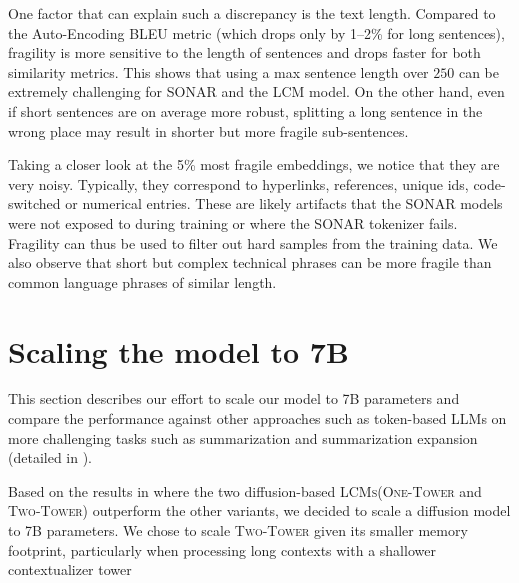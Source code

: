 \documentclass[twoside,11pt]{fairmeta}
\newcommand{\sonar}{\textsc{SONAR}\xspace}
\newcommand{\lcm}{\textsc{LCM}\xspace}
\newcommand{\lcms}{\textsc{LCMs}\xspace}
\newcommand{\twotower}{\textsc{Two-Tower}\xspace}
\newcommand{\interleaved}{\textsc{One-Tower}\xspace}
\newcommand{\ctxenc}{contextualizer\xspace}
\begin{document}
One factor that can explain such a discrepancy is the text length. Compared to the Auto-Encoding BLEU metric (which drops only by 1--2\% for long sentences),
fragility is more sensitive to the length of sentences and drops faster for both similarity metrics.
This shows that using a max sentence length over $250$ can be extremely challenging for \sonar and the \lcm model.
On the other hand, even if short sentences are on average more robust, 
splitting a long sentence in the wrong place may result in shorter but more fragile sub-sentences.

Taking a closer look at the 5\% most fragile embeddings, we notice that they are very noisy. 
Typically, they correspond to hyperlinks, references, unique ids, code-switched or numerical entries. These are likely artifacts that the \sonar models were not exposed to during training or where the \sonar tokenizer fails.
Fragility can thus be used to filter out hard samples from the training data.
We also observe that short but complex technical phrases can be more fragile than common language phrases of similar length.

\section{Scaling the model to 7B}
\label{sec:bigmodel}

This section describes our effort to scale our model to 7B parameters and compare the performance against other approaches such as token-based LLMs on more challenging tasks such as summarization and summarization expansion (detailed in ).

Based on the results in  where the two diffusion-based \lcms (\interleaved and \twotower) outperform the other variants, we decided to scale a diffusion model to 7B parameters.
We chose to scale \twotower given its smaller memory footprint, particularly when processing long contexts with a shallower \ctxenc tower 
\end{document}
